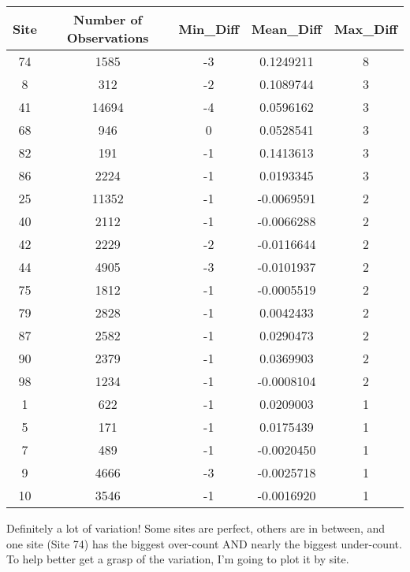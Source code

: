 \documentclass[
]{book}
\begin{document}
\begin{tabular}{c|c|c|c|c}
\hline
Site & Number of Observations & Min\_Diff & Mean\_Diff & Max\_Diff\\
\hline
74 & 1585 & -3 & 0.1249211 & 8\\
\hline
8 & 312 & -2 & 0.1089744 & 3\\
\hline
41 & 14694 & -4 & 0.0596162 & 3\\
\hline
68 & 946 & 0 & 0.0528541 & 3\\
\hline
82 & 191 & -1 & 0.1413613 & 3\\
\hline
86 & 2224 & -1 & 0.0193345 & 3\\
\hline
25 & 11352 & -1 & -0.0069591 & 2\\
\hline
40 & 2112 & -1 & -0.0066288 & 2\\
\hline
42 & 2229 & -2 & -0.0116644 & 2\\
\hline
44 & 4905 & -3 & -0.0101937 & 2\\
\hline
75 & 1812 & -1 & -0.0005519 & 2\\
\hline
79 & 2828 & -1 & 0.0042433 & 2\\
\hline
87 & 2582 & -1 & 0.0290473 & 2\\
\hline
90 & 2379 & -1 & 0.0369903 & 2\\
\hline
98 & 1234 & -1 & -0.0008104 & 2\\
\hline
1 & 622 & -1 & 0.0209003 & 1\\
\hline
5 & 171 & -1 & 0.0175439 & 1\\
\hline
7 & 489 & -1 & -0.0020450 & 1\\
\hline
9 & 4666 & -3 & -0.0025718 & 1\\
\hline
10 & 3546 & -1 & -0.0016920 & 1\\
\hline
\end{tabular}

Definitely a lot of variation! Some sites are perfect, others are in between, and one site (Site 74) has the biggest over-count AND nearly the biggest under-count. To help better get a grasp of the variation, I'm going to plot it by site.
\end{document}
